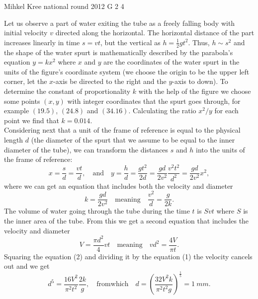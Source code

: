 \documentclass[11pt]{article}
\begin{document}
{Mihkel Kree} %
{national round} %
{2012} %
{G 2} %
{4} %
{

\ifEngSolution
Let us observe a part of water exiting the tube as a freely falling body with initial velocity $v$ directed along the horizontal. The horizontal distance of the part increases linearly in time $s=vt$, but the vertical as $h=\frac{1}{2}gt^2$. Thus, $h\sim s^2$ and the shape of the water spurt is mathematically described by the parabola’s equation $y=kx^2$ where $x$ and $y$ are the coordinates of the water spurt in the units of the figure’s coordinate system (we choose the origin to be the upper left corner, let the $x$-axis be directed to the right and the $y$-axis to down). To determine the constant of proportionality $k$ with the help of the figure we choose some points $(x,y)$ with integer coordinates that the spurt goes through, for example $(\num{19,5})$, $(\num{24,8})$ and $(\num{34,16})$. Calculating the ratio $x^2/y$ for each point we find that $k=\num{0.014}$.\\
Considering next that a unit of the frame of reference is equal to the physical length $d$ (the diameter of the spurt that we assume to be equal to the inner diameter of the tube), we can transform the distances $s$ and $h$ into the units of the frame of reference:
\[x=\frac{s}{d}=\frac{vt}{d},\quad \mathrm{and} \quad y=\frac{h}{d}=\frac{gt^2}{2d}=\frac{gd}{2v^2}\frac{v^2t^2}{d^2}=\frac{gd}{2v^2}x^2,\] 
where we can get an equation that includes both the velocity and diameter
\begin{equation}\label{eq:2012-v3g-02-vd1}
k=\frac{gd}{2v^2}\quad \mathrm{meaning} \quad \frac{v^2}{d}=\frac{g}{2k}.
\end{equation} 
The volume of water going through the tube during the time $t$ is $Svt$ where $S$ is the inner area of the tube. From this we get a second equation that includes the velocity and diameter
\begin{equation}\label{eq:2012-v3g-02-vd2}
V=\frac{\pi d^2}{4}vt \quad \mathrm{meaning} \quad vd^2=\frac{4V}{\pi t}.
\end{equation} 
Squaring the equation (2) and dividing it by the equation (1) the velocity cancels out and we get
\[d^5=\frac{16V^2}{\pi^2t^2}\frac{2k}{g}, \quad \mathrm{from which} \quad d=\left(\frac{32V^2k}{\pi^2 t^2 g}\right)^{\frac{1}{5}}=\SI{1}{mm	}.\]
\fi
}
\end{document}
